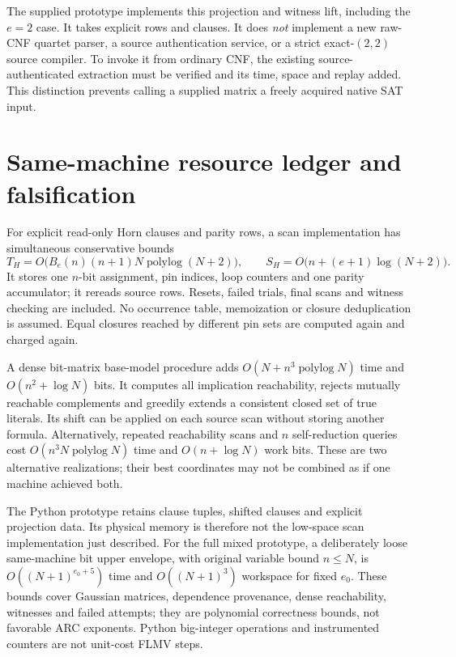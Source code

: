 \documentclass[11pt]{article}
\begin{document}
The supplied prototype implements this projection and witness lift, including
the $e=2$ case. It takes explicit rows and clauses. It does \emph{not}
implement a new raw-CNF quartet parser, a source authentication service, or a
strict exact-$(2,2)$ source compiler. To invoke it from ordinary CNF, the
existing source-authenticated extraction must be verified and its time,
space and replay added. This distinction prevents calling a supplied matrix
a freely acquired native SAT input.

\section{Same-machine resource ledger and falsification}
For explicit read-only Horn clauses and parity rows, a scan implementation
has simultaneous conservative bounds
\[
 T_H=O\bigl(B_e(n)(n+1)N\operatorname{polylog}(N+2)\bigr),\qquad
 S_H=O\bigl(n+(e+1)\log(N+2)\bigr).
\]
It stores one $n$-bit assignment, pin indices, loop counters and one parity
accumulator; it rereads source rows. Resets, failed trials, final scans and
witness checking are included. No occurrence table, memoization or closure
deduplication is assumed. Equal closures reached by different pin sets are
computed again and charged again.

A dense bit-matrix base-model procedure adds $O(N+n^3\operatorname{polylog}N)$
time and $O(n^2+\log N)$ bits. It computes all implication reachability,
rejects mutually reachable complements and greedily extends a consistent
closed set of true literals. Its shift can be applied on each source scan
without storing another formula. Alternatively, repeated reachability scans
and $n$ self-reduction queries cost $O(n^3N\operatorname{polylog}N)$ time
and $O(n+\log N)$ work bits. These are two alternative realizations; their
best coordinates may not be combined as if one machine achieved both.

The Python prototype retains clause tuples, shifted clauses and explicit
projection data. Its physical memory is therefore not the low-space scan
implementation just described. For the full mixed prototype, a deliberately
loose same-machine bit upper envelope, with original variable bound $n\le N$,
is $O((N+1)^{e_0+5})$ time and $O((N+1)^3)$ workspace for fixed $e_0$.
These bounds cover Gaussian matrices, dependence provenance, dense
reachability, witnesses and failed attempts; they are polynomial correctness
bounds, not favorable ARC exponents. Python big-integer operations and
instrumented counters are not unit-cost FLMV steps.
\end{document}
